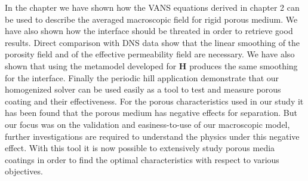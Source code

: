 In the chapter we have shown how the VANS equations derived in chapter 2 can be used to describe the averaged macroscopic field for rigid porous medium. We have also shown how the interface should be threated in order to retrieve good results. Direct comparison with DNS data show that the linear smoothing of the porosity field and of the effective permeability field are necessary. We have also shown that using the metamodel developed for $\mathbf{H}$ produces the same smoothing for the interface. Finally the periodic hill application demonstrate that our homogenized solver can be used easily as a tool to test and measure porous coating and their effectiveness.
For the porous characteristics used in our study it has been found that the porous medium has negative effects for separation. But our focus was on the validation and easiness-to-use of our macroscopic model, further investigations are required to understand the physics under this negative effect. With this tool it is now possible to extensively study porous media coatings in order to find the optimal characteristics with respect to various objectives.
